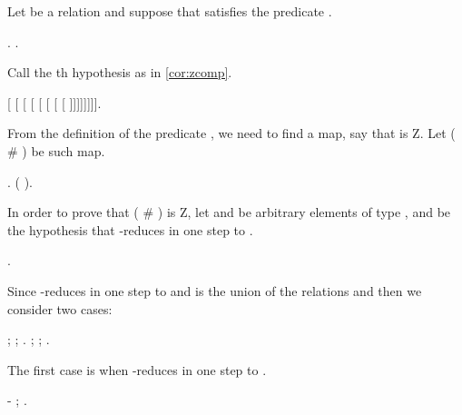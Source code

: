 Let  be a relation and suppose that  satisfies the predicate . \begin{coqdoccode}
\coqdocemptyline
\coqdocindent{1.00em}
  .    .\coqdoceol
\coqdocemptyline
\end{coqdoccode}
Call  the th hypothesis as in \ref{cor:zcomp}.  \begin{coqdoccode}
\coqdocemptyline
\coqdocindent{1.00em}
   [ [ [ [ [ [ [ [ ]]]]]]]].\coqdoceol
\coqdocemptyline
\end{coqdoccode}
From the definition of the predicate , we need to find a map, say  that is Z. Let ( \# ) be such map.  \begin{coqdoccode}
\coqdocemptyline
\coqdocindent{1.00em}
 . \coqdoctac{\ensuremath{\exists}} (  ).\coqdoceol
\coqdocemptyline
\end{coqdoccode}
In order to prove that ( \# ) is Z, let  and  be arbitrary elements of type , and  be the hypothesis that  -reduces in one step to .  \begin{coqdoccode}
\coqdocemptyline
\coqdocindent{1.00em}
   .\coqdoceol
\coqdocemptyline
\end{coqdoccode}
Since  -reduces in one step to  and  is the union of the relations  and  then we consider two cases: \begin{coqdoccode}
\coqdocemptyline
\coqdocindent{1.00em}
 ; ;  .  ; ;  .\coqdoceol
\coqdocemptyline
\end{coqdoccode}
The first case is when  -reduces in one step to . \begin{coqdoccode}
\coqdocemptyline
\coqdocindent{1.00em}
-  ; .\coqdoceol
\coqdocemptyline
\end{coqdoccode}
